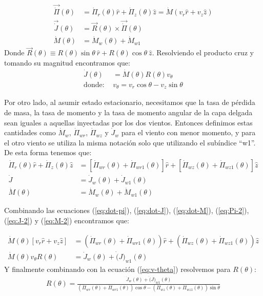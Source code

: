 \begin{align}
  \vec{\dot{\Pi}}(\theta) &= \dot{\Pi}_r(\theta) \hat{r} + \dot{\Pi}_z(\theta) \hat{z} = \dot{M}\left(v_r \hat{r} + v_z\hat{z}\right) \label{eq:dot-pi}\\
  \vec{\dot{J}}(\theta) &= \vec{R}(\theta) \times \vec{\dot{\Pi}}(\theta)  \\
  \dot{M}(\theta) &= \dot{M}_w(\theta) + \dot{M}_{w1} \label{eq:dot-M}
\end{align}
Donde $\vec{R}(\theta)\equiv R(\theta)\sin\theta~\hat{r} + R(\theta)\cos\theta~\hat{z}$. Resolviendo el producto cruz y tomando su magnitud encontramos que:
\begin{align}
  \dot{J}(\theta) &= \dot{M}(\theta)R(\theta)v_\theta \label{eq:dot-J}\\
  \mathrm{donde:~} & v_\theta = v_r\cos\theta - v_z\sin\theta \label{eq:v-theta}
\end{align}

Por otro lado, al asumir estado estacionario, necesitamos que la tasa de pérdida de masa, la tasa de momento y la tasa de momento angular de la capa delgada sean iguales a aquellas inyectadas por los dos vientos. Entonces definimos estas cantidades como $\dot{M}_w$, $\dot{\Pi}_{wr}$, $\dot{\Pi}_{wz}$ y $\dot{J}_{w}$ para el viento con menor momento, y para el otro viento se utiliza la misma notación solo que utilizando el subíndice ``w1''. De esta forma tenemos que:
\begin{align}
  \dot{\Pi}_r(\theta)\hat{r} + \dot{\Pi}_z(\theta)\hat{z} &= \left[\dot{\Pi}_{wr}(\theta)+ \dot{\Pi}_{wr1}(\theta)\right]\hat{r} + \left[\dot{\Pi}_{wz}(\theta)+ \dot{\Pi}_{wz1}(\theta)\right]\hat{z} \label{eq:Pi-2} \\
  \dot{J} &=\dot{J}_w(\theta) + \dot{J}_{w1}(\theta) \label{eq:J-2}\\
  \dot{M}(\theta) &= \dot{M}_w(\theta) + \dot{M}_{w1}(\theta) \label{eq:M-2}
\end{align}

Combinando las ecuaciones (\ref{eq:dot-pi}), (\ref{eq:dot-J}), (\ref{eq:dot-M}), (\ref{eq:Pi-2}), (\ref{eq:J-2}) y (\ref{eq:M-2}) encontramos que:

\begin{align}
  \dot{M}(\theta)\left[v_r \hat{r} + v_z\hat{z}\right] &= \left(\dot{\Pi}_{wr}(\theta) + \dot{\Pi}_{wr1}(\theta)\right)\hat{r} +
                                                         \left(\dot{\Pi}_{wz}(\theta) + \dot{\Pi}_{wz1}(\theta)\right)\hat{z} \\
  \dot{M}(\theta)v_\theta R(\theta) &= \dot{J}_w(\theta) + \dot(J)_{w1}(\theta)
\end{align}
Y finalmente combinando con la ecuación (\ref{eq:v-theta}) resolvemos para $R(\theta)$:
\begin{align}
  R(\theta) = \frac{\dot{J}_w(\theta) + \dot(J)_{w1}(\theta)}{\left(\dot{\Pi}_{wr}(\theta) + \dot{\Pi}_{wr1}(\theta)\right)\cos\theta - \left(\dot{\Pi}_{wz}(\theta) + \dot{\Pi}_{wz1}(\theta)\right)\sin\theta} \label{eq:R-wind}
\end{align}



